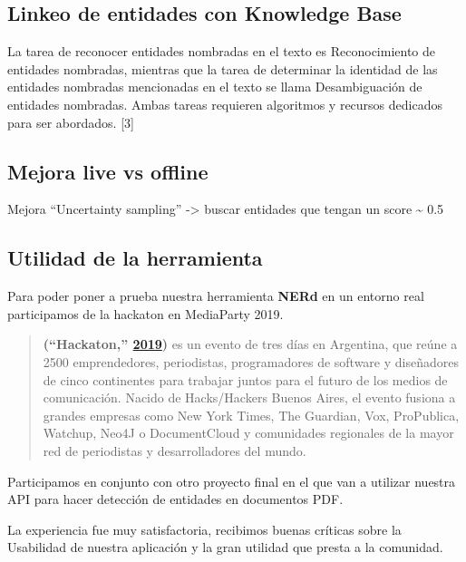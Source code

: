 \documentclass[12pt,a4paper,]{scrartcl}
\begin{document}
\hypertarget{linkeo-de-entidades-con-knowledge-base}{%
\subsection{Linkeo de entidades con Knowledge Base}\label{linkeo-de-entidades-con-knowledge-base}}

La tarea de reconocer entidades nombradas en el texto es Reconocimiento de entidades nombradas, mientras que la tarea de determinar la identidad de las entidades nombradas mencionadas en el texto se llama Desambiguación de entidades nombradas. Ambas tareas requieren algoritmos y recursos dedicados para ser abordados. {[}3{]}

\hypertarget{mejora-live-vs-offline}{%
\subsection{Mejora live vs offline}\label{mejora-live-vs-offline}}

Mejora \enquote{Uncertainty sampling} -\textgreater{} buscar entidades que tengan un score \textasciitilde{} 0.5

\hypertarget{utilidad-de-la-herramienta}{%
\subsection{Utilidad de la herramienta}\label{utilidad-de-la-herramienta}}

Para poder poner a prueba nuestra herramienta \textbf{NERd} en un entorno real participamos de la hackaton en MediaParty 2019.

\begin{quote}
\textbf{(``Hackaton,'' \protect\hyperlink{ref-hackaton2019}{2019})} es un evento de tres días en Argentina, que reúne a 2500 emprendedores, periodistas, programadores de software y diseñadores de cinco continentes para trabajar juntos para el futuro de los medios de comunicación.
Nacido de Hacks/Hackers Buenos Aires, el evento fusiona a grandes empresas como New York Times, The Guardian, Vox, ProPublica, Watchup, Neo4J o DocumentCloud y comunidades regionales de la mayor red de periodistas y desarrolladores del mundo.
\end{quote}

Participamos en conjunto con otro proyecto final en el que van a utilizar nuestra API para hacer detección de entidades en documentos PDF.

La experiencia fue muy satisfactoria, recibimos buenas críticas sobre la Usabilidad de nuestra aplicación y la gran utilidad que presta a la comunidad.
\end{document}

